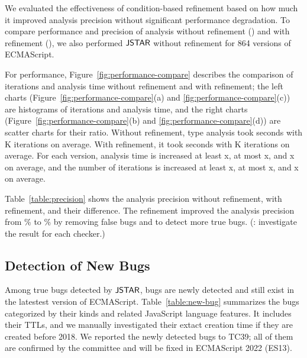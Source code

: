 We evaluated the effectiveness of condition-based refinement based on how much
it improved analysis precision without significant performance degradation.  To
compare performance and precision of analysis without refinement
() and with refinement (), we also performed
$\tool$ without refinement for 864 versions of ECMAScript.

For performance, Figure~\ref{fig:performance-compare} describes the comparison
of iterations and analysis time without refinement and with refinement; the left
charts (Figure~\ref{fig:performance-compare}(a) and
\ref{fig:performance-compare}(c)) are histograms of iterations and analysis
time, and the right charts (Figure~\ref{fig:performance-compare}(b) and
\ref{fig:performance-compare}(d)) are scatter charts for their ratio.  Without
refinement, type analysis took  seconds with K
iterations on average.  With refinement, it took  seconds with
K iterations on average.  For each version, analysis time is
increased at least x, at most x, and x on
average, and the number of iterations is increased at least x, at
most x, and x on average.

Table~\ref{table:precision} shows the analysis precision without refinement,
with refinement, and their difference.  The refinement improved the analysis
precision from \% to \% by removing  false
bugs and to detect  more true bugs.  (\todo: investigate the result for
each checker.)


\subsection{Detection of New Bugs}\label{sec:new-bug}

Among  true bugs detected by $\tool$,  bugs are newly
detected and still exist in the latestest version of ECMAScript.
Table~\ref{table:new-bug} summarizes the bugs categorized by their kinds and
related JavaScript language features. It includes their TTLs, and we manually
investigated their extact creation time if they are created before 2018.  We
reported the newly detected bugs to TC39; all of them are confirmed by the
committee and will be fixed in ECMAScript 2022 (ES13).

